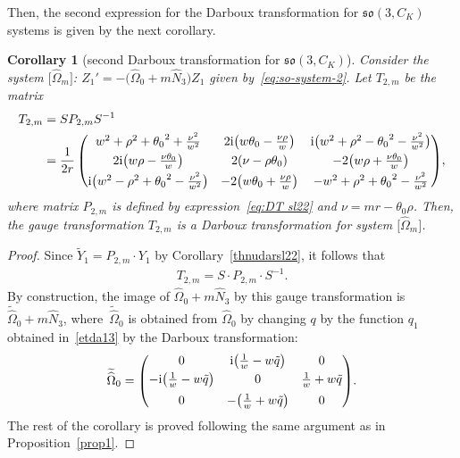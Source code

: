 \documentclass[pdftex]{sigma}%
\numberwithin{equation}{section}
\newtheorem{Corollary}[Theorem]{Corollary}
\begin{document}
 Then, the second expression for the Darboux transformation for $\mathfrak{so}(3, C_K)$ systems is given by the next corollary.

\begin{Corollary}[second Darboux transformation for $\mathfrak{so}(3, C_K)$]\label{secthdars032}
Consider the system $\big[\widehat{\Omega}_m\big]$\emph{:} $Z_1' = - \big(\widehat{\Omega}_0 + m \widehat{N}_3 \big) Z_1$ given by~\eqref{eq:so-system-2}. Let $T_{2,m}$ be the matrix
\begin{align*}
 T_{2,m} &= S P_{2,m} S^{-1} \nonumber
 \\
 &= \dfrac{1}{2r} \begin{pmatrix} {w}^{2}+{\rho}^{2}+{\theta_0 }^{2}+{\frac {{\nu}^{2}}{{w}^{2}}} & 2{\rm i} \big (w \theta_0 -{\frac {\nu \rho}{w}} \big )
& {\rm i} \big ( {w}^{2}+ {\rho}^{2}- {\theta_0 }^{2}-{\frac {{\nu}^{2}}{{w}^{2}}} \big )
\\[1mm]
2 {\rm i} \big ( w \rho-{\frac {\nu \theta_0 }{w}} \big ) & 2 ( \nu - \rho \theta_0 ) & -2 \big ( w \rho + {\frac { \nu \theta_0 }{w}} \big )
\\[1mm]
{\rm i} \big ( {w}^{2}- {\rho}^{2}+ {\theta_0 }^{2}-{\frac {{\nu}^{2}}{{w}^{2}}} \big ) & -2 \big( w \theta_0 + {\frac {\nu \rho}{w}} \big ) & -{
w}^{2}+{\rho}^{2}+{\theta_0 }^{2}-{\frac {{\nu}^{2}}{{w}^{2}}}
\end{pmatrix}\!,
\end{align*}
where matrix $P_{2,m}$ is defined by expression~\eqref{eq:DT sl22} and $\nu=mr-\theta_0 \rho$. Then, the gauge transformation $T_{2,m}$ is a Darboux transformation for system $\big[\widehat{\Omega}_m\big]$.
\end{Corollary}

\begin{proof}
Since $ \widetilde{Y}_1 =P_{2,m} \cdot Y_1$ by Corollary~\ref{thnudarsl22},
it follows that
\begin{gather*}
T_{2,m} = S \cdot P_{2,m} \cdot S^{-1}.
\end{gather*}
By construction, the image of $\widehat{\Omega}_0 + m \widehat{N}_3$ by this gauge transformation is
$\widetilde{\widehat{\Omega}}_0 + m \widehat{N}_3$, where~$\widetilde{\widehat{\Omega}}_0$ is obtained from $\widehat{\Omega}_0$ by changing $q$ by the function $q_{1}$ obtained in~\eqref{etda13} by the Darboux transformation:
\begin{gather*}
\widetilde{\widehat{\Omega}}_0 = \begin{pmatrix}
 0 & {\rm i} \big (\frac{1}{w} - w\tilde{q} \big) & 0
 \vspace{1mm}\\
 -{\rm i} \big (\frac{1}{w} - w\tilde{q} \big) & 0 & \frac{1}{w} + w\tilde{q} \\[5pt] 0 & - \big ( \frac{1}{w} + w\tilde{q} \big ) & 0 \end{pmatrix}\!.
 \end{gather*}
The rest of the corollary is proved following the same argument as in Proposition~\ref{prop1}.
\end{proof}
\end{document}
